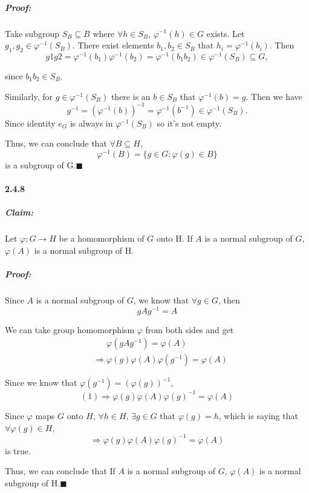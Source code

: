 \documentclass[11pt]{article}
\begin{document}
		\subparagraph{Proof:}
			Take subgroup $S_B \subseteq B$ where $\forall h \in S_B$, $\varphi^{-1}(h) \in G$ exists. Let $g_1, g_2 \in \varphi^{-1}(S_B)$. There exist elements $b_1, b_2 \in S_B$ that $h_i = \varphi^{-1}(b_i)$. Then \[g1g2 = \varphi^{-1}(b_1)\varphi^{-1}(b_2) = \varphi^{-1}(b_1b_2) \in \varphi^{-1}(S_B) \subseteq G,\]
			
			since $b_1b_2 \in S_B$. 
			
			Similarly, for $g \in \varphi^{-1}(S_B)$ there is an $b \in S_B$ that $\varphi^{-1}(b) = g$. Then we have 
					\[g^{-1} = (\varphi^{-1}(b))^{-1} = \varphi^{-1}(b^{-1}) \in \varphi^{-1}(S_B).\]
		 	Since identity $e_G$ is always in $\varphi^{-1}(S_B)$ so it's not empty.
		 	
		 	Thus, we can conclude that $\forall B \subseteq H$, \[\varphi^{-1}(B) = \{g \in G: \varphi(g) \in B\}\]
			is a subgroup of G.$\blacksquare$

	\paragraph{2.4.8}
		\subparagraph{Claim:} Let $\varphi: G \rightarrow H$ be a homomorphism of $G$ onto H. If $A$ is a normal subgroup of $G$, $\varphi(A)$ is a normal subgroup of H.
		\subparagraph{Proof:} Since $A$ is a normal subgroup of $G$, we know that $\forall g \in G$, then 
			\[gAg^{-1} = A\]
			
			We can take group homomorphism $\varphi$ from both sides and get 
			\begin{align}
				&\phantom{\Rightarrow}\varphi(gAg^{-1}) = \varphi(A)\nonumber\\
				&\Rightarrow\varphi(g)\varphi(A)\varphi(g^{-1}) = \varphi(A)
			\end{align}
			
			Since we know that $\varphi(g^{-1}) = (\varphi(g))^{-1}$, 
			\[(1) \Rightarrow \varphi(g)\varphi(A)\varphi(g)^{-1} = \varphi(A)\]
			
			Since $\varphi$ maps $G$ onto $H$, $\forall h \in H$, $\exists g \in G$ that $\varphi(g) = h$, which is saying that $\forall \varphi(g) \in H$, 
				\[\Rightarrow \varphi(g)\varphi(A)\varphi(g)^{-1} = \varphi(A)\] 
			is true.
			
			Thus, we can conclude that If $A$ is a normal subgroup of $G$, $\varphi(A)$ is a normal subgroup of H.$\blacksquare$
\end{document}
